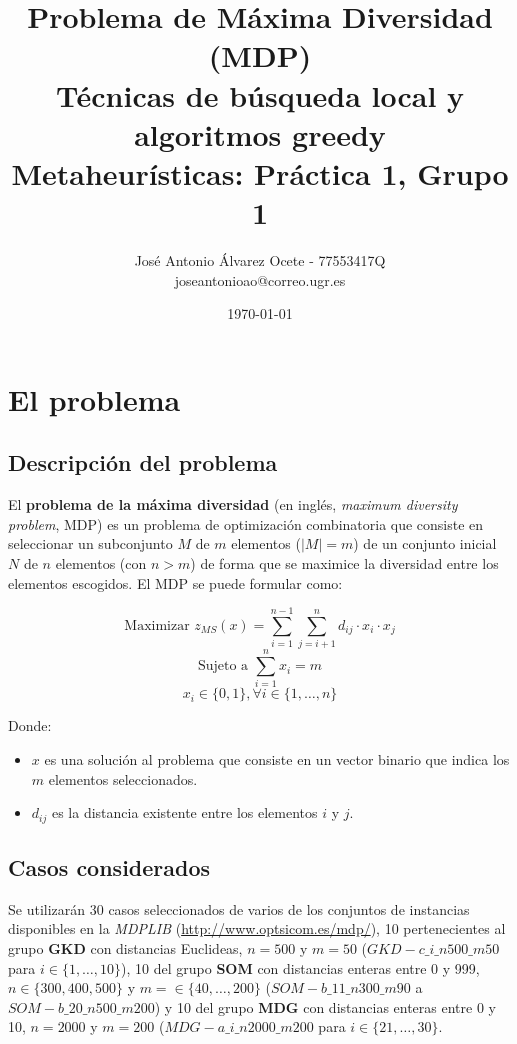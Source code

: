 \documentclass[11pt,a4paper]{article}
\title{Problema de Máxima Diversidad (MDP) 
	\\\medskip \large Técnicas de búsqueda local y algoritmos greedy \\\medskip
	\large Metaheurísticas: Práctica 1, Grupo 1}
\author{José Antonio Álvarez Ocete - 77553417Q \\ joseantonioao@correo.ugr.es}
\date{ \today }
\begin{document}
	
	
	\maketitle 
	\newpage
	\tableofcontents
	\newpage
	
	
	\section{El problema}
	
	\subsection{Descripción del problema}
	
	El \textbf{problema de la máxima diversidad} (en inglés, \emph{maximum diversity problem}, MDP) es un problema de optimización combinatoria que consiste en seleccionar un
	subconjunto $M$ de $m$ elementos ($|M|=m$) de un conjunto inicial $N$ de $n$ elementos (con $n>m$) de forma que se maximice la diversidad entre los elementos escogidos. El MDP se puede formular como:
	
	$$ \text{Maximizar } z_{MS}(x) = \sum_{i=1}^{n-1} \sum_{j=i+1}^{n} d_{ij} \cdot x_i \cdot x_j $$
	$$ \text{Sujeto a } \sum_{i=1}^{n} x_i = m $$
	$$ x_i \in \{0,1\}, \forall i \in \{1,\dotsc,n\} $$
	
	Donde:
	\begin{itemize}
		\item $x$ es una solución al problema que consiste en un vector binario que indica los $m$ elementos seleccionados.
		\item $d_{ij}$ es la distancia existente entre los elementos $i$ y $j$.
		
	\end{itemize}

	\subsection{Casos considerados}
	
	Se utilizarán 30 casos seleccionados de varios de los conjuntos de instancias disponibles en la \emph{MDPLIB} (\url{http://www.optsicom.es/mdp/}), 10 pertenecientes al grupo \textbf{GKD} con distancias Euclideas, $n=500$ y $m=50$ ($GKD-c\_i\_n500\_m50$ para $i\in\{1,\dotsc,10\}$), 10 del grupo \textbf{SOM} con distancias enteras entre 0 y 999, $n\in\{300,400,500\}$ y $m=\in\{40,\dotsc,200\}$ ($SOM-b\_11\_n300\_m90$ a $SOM-b\_20\_n500\_m200$) y 10 del grupo \textbf{MDG} con distancias enteras entre 0 y 10, $n=2000$ y $m=200$ ($MDG-a\_i\_n2000\_m200$ para $i\in\{21,\dotsc,30\}$. \\
	
\end{document}
